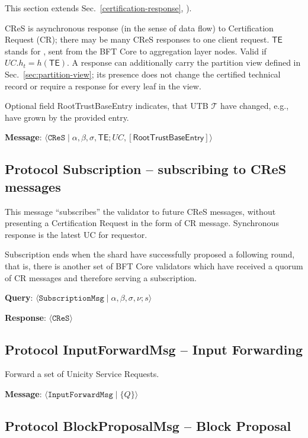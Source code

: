 This section extends Sec.~\ref{certification-response}, ).

CReS is asynchronous response (in the sense of data flow) to Certification Request (CR); there may be many CReS responses to one client request. $\mathsf{TE}$ stands for , sent from the BFT Core to aggregation layer nodes. Valid if $UC.h_t = h(\mathsf{TE})$. A response can additionally carry the partition view defined in Sec.~\ref{sec:partition-view}; its presence does not change the certified technical record or require a response for every leaf in the view.

Optional field RootTrustBaseEntry indicates, that UTB $\mathcal{T}$ have changed, e.g., have grown by the provided entry.

\textbf{Message}: $\langle \texttt{CReS} \mid \alpha, \beta, \sigma, \mathsf{TE}; UC, [\textsf{RootTrustBaseEntry}]\rangle$


\subsection{Protocol Subscription -- subscribing to CReS messages}

This message ``subscribes'' the validator to future CReS messages, without presenting a Certification Request in the form of CR message. Synchronous response is the latest UC for requestor.

Subscription ends when the shard have successfully proposed a following round, that is, there is another set of BFT Core validators which have received a quorum of CR messages and therefore serving a subscription.

\textbf{Query}: $\langle \texttt{SubscriptionMsg} \mid \alpha, \beta, \sigma, \nu; s \rangle$

\textbf{Response}: $\langle \texttt{CReS} \rangle$


\subsection{Protocol InputForwardMsg -- Input Forwarding}\label{protocol-pc1-i-input-forwarding}

Forward a set of Unicity Service Requests.

\textbf{Message}: $\langle \texttt{InputForwardMsg} \mid \{Q\}\rangle$


\subsection{Protocol BlockProposalMsg -- Block Proposal}\label{protocol-pc1-o-block-proposal}

